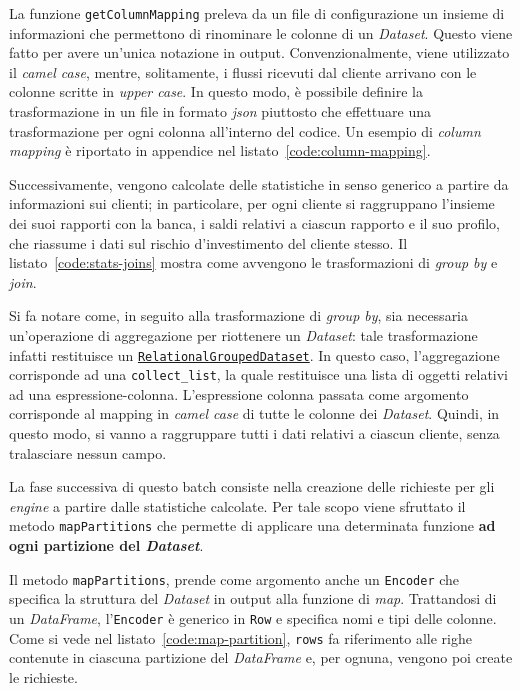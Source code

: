 

La funzione \texttt{getColumnMapping} preleva da un file di configurazione un insieme di informazioni che permettono di rinominare le colonne di un \textit{Dataset}.
Questo viene fatto per avere un'unica notazione in output.
Convenzionalmente, viene utilizzato il \textit{camel case}, mentre, solitamente, i flussi ricevuti dal cliente arrivano con le colonne scritte in \textit{upper case}.
In questo modo, è possibile definire la trasformazione in un file in formato \textit{json} piuttosto che effettuare una trasformazione per ogni colonna all'interno del codice.
Un esempio di \textit{column mapping} è riportato in appendice nel listato~\ref{code:column-mapping}.

Successivamente, vengono calcolate delle statistiche in senso generico a partire da informazioni sui clienti;
in particolare, per ogni cliente si raggruppano l'insieme dei suoi rapporti con la banca, i saldi relativi a ciascun rapporto e il suo profilo, che riassume i dati sul rischio d'investimento del cliente stesso.
Il listato~\ref{code:stats-joins} mostra come avvengono le trasformazioni di \textit{group by} e \textit{join}.



Si fa notare come, in seguito alla trasformazione di \textit{group by}, sia necessaria un'operazione di aggregazione per riottenere un \textit{Dataset}:
tale trasformazione infatti restituisce un \href{https://spark.apache.org/docs/latest/api/scala/org/apache/spark/sql/RelationalGroupedDataset.html}{\texttt{RelationalGroupedDataset}}.
In questo caso, l'aggregazione corrisponde ad una \texttt{collect\_list}, la quale restituisce una lista di oggetti relativi ad una espressione-colonna.
L'espressione colonna passata come argomento corrisponde al mapping in \textit{camel case} di tutte le colonne dei \textit{Dataset}.
Quindi, in questo modo, si vanno a raggruppare tutti i dati relativi a ciascun cliente, senza tralasciare nessun campo.

La fase successiva di questo batch consiste nella creazione delle richieste per gli \textit{engine} a partire dalle statistiche calcolate.
Per tale scopo viene sfruttato il metodo \texttt{mapPartitions} che permette di applicare una determinata funzione \textbf{ad ogni partizione del \textit{Dataset}}.



Il metodo \texttt{mapPartitions}, prende come argomento anche un \texttt{Encoder} che specifica la struttura del \textit{Dataset} in output alla funzione di \textit{map}.
Trattandosi di un \textit{DataFrame}, l'\texttt{Encoder} è generico in \texttt{Row} e specifica nomi e tipi delle colonne.
Come si vede nel listato~\ref{code:map-partition}, \texttt{rows} fa riferimento alle righe contenute in ciascuna partizione del \textit{DataFrame} e, per ognuna, vengono poi create le richieste.

